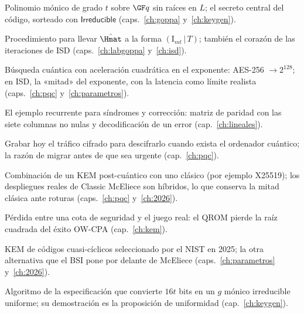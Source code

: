 \begin{description}[leftmargin=2.6em,style=nextline,itemsep=2.5pt,parsep=0pt]
  \item[\textbf{$g$ (polinomio de Goppa)}]
        Polinomio mónico de grado $t$ sobre $\GF q$ sin raíces en
        $L$; el secreto central del código, sorteado con
        $\textsf{Irreducible}$ (caps.~\ref{ch:goppa}
        y~\ref{ch:keygen}).

  \item[\textbf{Gaussiana (eliminación)}]
        Procedimiento para llevar $\hat{\Hmat}$ a la forma
        $(\mathrm{I}_{mt}\,|\,T)$; también el corazón de las
        iteraciones de ISD (caps.~\ref{ch:labgoppa}
        y~\ref{ch:isd}).

  \item[\textbf{Grover, algoritmo de}]
        Búsqueda cuántica con aceleración cuadrática en el
        exponente: AES-256 $\to2^{128}$; en ISD, la «mitad» del
        exponente, con la latencia como límite realista
        (caps.~\ref{ch:pqc} y~\ref{ch:parametros}).

  \item[\textbf{Hamming, código de} {($[7,4,3]$)}]
        El ejemplo recurrente para síndromes y corrección: matriz
        de paridad con las siete columnas no nulas y decodificación
        de un error (cap.~\ref{ch:lineales}).

  \item[\textbf{Harvest now, decrypt later}]
        Grabar hoy el tráfico cifrado para descifrarlo cuando
        exista el ordenador cuántico; la razón de migrar antes de
        que sea urgente (cap.~\ref{ch:pqc}).

  \item[\textbf{Híbrido}]
        Combinación de un KEM post-cuántico con uno clásico (por
        ejemplo X25519); los despliegues reales de Classic
        McEliece son híbridos, lo que conserva la mitad clásica
        ante roturas (caps.~\ref{ch:pqc} y~\ref{ch:2026}).

  \item[\textbf{Holgura} (\emph{tightness})]
        Pérdida entre una cota de seguridad y el juego real: el
        QROM pierde la raíz cuadrada del éxito OW-CPA
        (cap.~\ref{ch:kem}).

  \item[\textbf{HQC}]
        KEM de códigos cuasi-cíclicos seleccionado por el NIST en
        2025; la otra alternativa que el BSI pone por delante de
        McEliece (caps.~\ref{ch:parametros} y~\ref{ch:2026}).

  \item[\textbf{Irreducible}]
        Algoritmo de la especificación que convierte $16t$ bits en
        un $g$ mónico irreducible uniforme; su demostración es la
        proposición de uniformidad (cap.~\ref{ch:keygen}).


\end{description}
